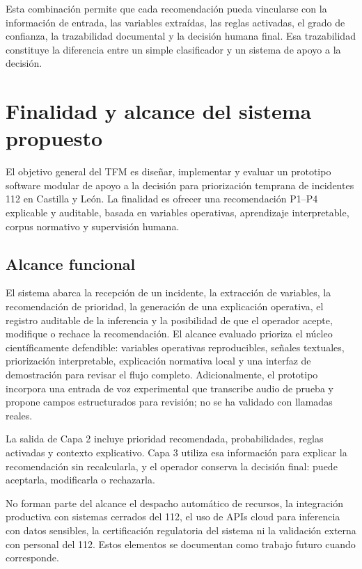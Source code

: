 Esta combinación permite que cada recomendación pueda vincularse con la información de entrada, las variables extraídas, las reglas activadas, el grado de confianza, la trazabilidad documental y la decisión humana final. Esa trazabilidad constituye la diferencia entre un simple clasificador y un sistema de apoyo a la decisión.

\section{Finalidad y alcance del sistema propuesto}

El objetivo general del TFM es diseñar, implementar y evaluar un prototipo software modular de apoyo a la decisión para priorización temprana de incidentes 112 en Castilla y León. La finalidad es ofrecer una recomendación P1--P4 explicable y auditable, basada en variables operativas, aprendizaje interpretable, corpus normativo y supervisión humana.

\subsection{Alcance funcional}

El sistema abarca la recepción de un incidente, la extracción de variables, la recomendación de prioridad, la generación de una explicación operativa, el registro auditable de la inferencia y la posibilidad de que el operador acepte, modifique o rechace la recomendación. El alcance evaluado prioriza el núcleo científicamente defendible: variables operativas reproducibles, señales textuales, priorización interpretable, explicación normativa local y una interfaz de demostración para revisar el flujo completo. Adicionalmente, el prototipo incorpora una entrada de voz experimental que transcribe audio de prueba y propone campos estructurados para revisión; no se ha validado con llamadas reales.

La salida de Capa 2 incluye prioridad recomendada, probabilidades, reglas activadas y contexto explicativo. Capa 3 utiliza esa información para explicar la recomendación sin recalcularla, y el operador conserva la decisión final: puede aceptarla, modificarla o rechazarla.

No forman parte del alcance el despacho automático de recursos, la integración productiva con sistemas cerrados del 112, el uso de APIs cloud para inferencia con datos sensibles, la certificación regulatoria del sistema ni la validación externa con personal del 112. Estos elementos se documentan como trabajo futuro cuando corresponde.

